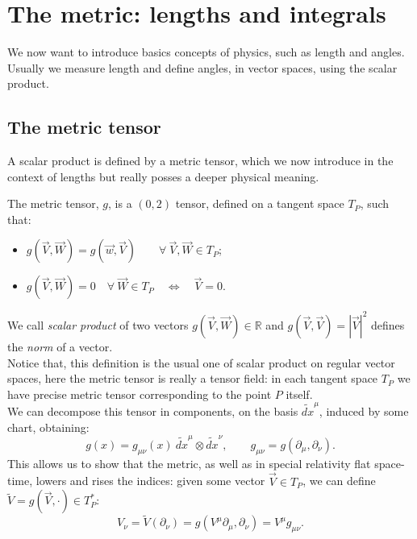 \section{The metric: lengths and integrals}
We now want to introduce basics concepts of physics, such as length and angles. Usually we measure length and define angles, in vector spaces, using the scalar product. 
\subsection{The metric tensor}
A scalar product is defined by a metric tensor, which we now introduce in the context of lengths but really posses a deeper physical meaning.
\begin{defin}
    The metric tensor, $g$, is a $(0,2)$ tensor, defined on a tangent space $T_P$, such that:
    \begin{itemize}
        \item $g(\vec V,\vec W)=g(\vec w,\vec V)\qquad \forall\ \vec V,\vec W\in T_P$;
        \item $g(\vec V,\vec W)=0\quad\forall\ \vec W\in T_P\quad\Leftrightarrow \quad \vec V=0$.
    \end{itemize}
\end{defin} 
We call \emph{scalar product} of two vectors $g(\vec V,\vec W)\in\mathbb{R}$ and $g(\vec V,\vec V)=|\vec V|^2$ defines the \emph{norm} of a vector.\\
Notice that, this definition is the usual one of scalar product on regular vector spaces, here the metric tensor is really a tensor field: in each tangent space $T_P$ we have precise metric tensor corresponding to the point $P$ itself.\\

We can decompose this tensor in components, on the basis $\tilde{dx}^\mu$, induced by some chart, obtaining: $$\boxed{g(x)=g_{\mu\nu}(x)\ \tilde{dx}^\mu\otimes\tilde{dx}^\nu}, \qquad\boxed{g_{\mu\nu}=g(\partial_\mu,\partial_\nu)}.$$
This allows us to show that the metric, as well as in special relativity flat space-time, lowers and rises the indices: given some vector $\vec V\in T_P$, we can define $\tilde{V}=g(\vec V,\cdot )\in T_P^*$:$$V_\nu=\tilde{V}(\partial_\nu)=g(V^\mu\partial_\mu,\partial_\nu)=V^\mu g_{\mu\nu}.$$

